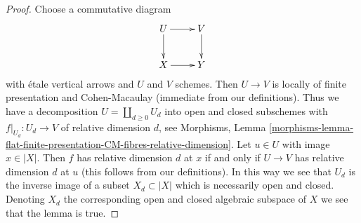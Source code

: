 \documentclass[10pt,a4paper]{amsart}
\theoremstyle{plain}
\theoremstyle{definition}
\theoremstyle{remark}
\numberwithin{equation}{subsection}
\begin{document}
\begin{proof}
Choose a commutative diagram
$$
\xymatrix{
U \ar[d] \ar[r] & V \ar[d] \\
X \ar[r] & Y
}
$$
with \'etale vertical arrows and $U$ and $V$ schemes.
Then $U \to V$ is locally of finite presentation and Cohen-Macaulay
(immediate from our definitions).
Thus we have a decomposition $U = \coprod_{d \geq 0} U_d$
into open and closed subschemes with $f|_{U_d} : U_d \to V$
of relative dimension $d$, see Morphisms, Lemma
\ref{morphisms-lemma-flat-finite-presentation-CM-fibres-relative-dimension}.
Let $u \in U$ with image $x \in |X|$. Then
$f$ has relative dimension $d$ at $x$ if and only if
$U \to V$ has relative dimension $d$ at $u$
(this follows from our definitions).
In this way we see that $U_d$ is the inverse image
of a subset $X_d \subset |X|$ which is necessarily
open and closed. Denoting $X_d$ the corresponding open
and closed algebraic subspace of $X$ we see that the lemma is true.
\end{proof}
\end{document}
